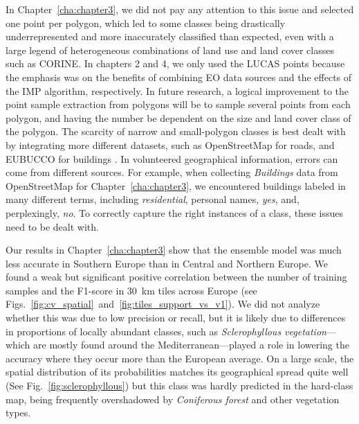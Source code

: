         In Chapter\@~\ref{cha:chapter3}, we did not pay any attention to this issue and selected one point per polygon, which led to some classes being drastically underrepresented and more inaccurately classified than expected, even with a large legend of heterogeneous combinations of land use and land cover classes such as CORINE. In chapters 2 and 4, we only used the LUCAS points because the emphasis was on the benefits of combining EO data sources and the effects of the IMP algorithm, respectively. In future research, a logical improvement to the point sample extraction from polygons will be to sample several points from each polygon, and having the number be dependent on the size and land cover class of the polygon. The scarcity of narrow and small-polygon classes is best dealt with by integrating more different datasets, such as OpenStreetMap for roads, and EUBUCCO for buildings \citep{milojevic2023eubucco}. In volunteered geographical information, errors can come from different sources. For example, when collecting \textit{Buildings} data from OpenStreetMap for Chapter\@~\ref{cha:chapter3}, we encountered buildings labeled in many different terms, including \textit{residential}, personal names, \textit{yes}, and, perplexingly, \textit{no}. To correctly capture the right instances of a class, these issues need to be dealt with.
        
        Our results in Chapter\@~\ref{cha:chapter3} show that the ensemble model was much less accurate in Southern Europe than in Central and Northern Europe. We found a weak but significant positive correlation between the number of training samples and the F1-score in 30~km tiles across Europe (see Figs.\@~\ref{fig:cv_spatial}\@~and\@~\ref{fig:tiles_support_vs_v1}). We did not analyze whether this was due to low precision or recall, but it is likely due to differences in proportions of locally abundant classes, such as \textit{Sclerophyllous vegetation}---which are mostly found around the Mediterranean---played a role in lowering the accuracy where they occur more than the European average. On a large scale, the spatial distribution of its probabilities matches its geographical spread quite well (See Fig.\@~\ref{fig:sclerophyllous}) but this class was hardly predicted in the hard-class map, being frequently overshadowed by \textit{Coniferous forest} and other vegetation types.  

